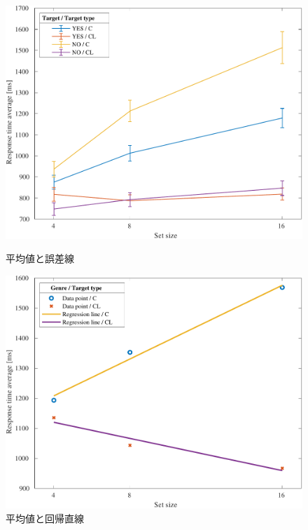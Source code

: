 \begin{figure}[H]
    \centering
    \begin{minipage}[b]{.49\textwidth}
        \centering
        \includegraphics[keepaspectratio,width=\textwidth]{../../Figures/14_01_graph.pdf}
        \caption{平均値と誤差線}
        \label{fig:平均値と誤差線}
    \end{minipage}
    \begin{minipage}[b]{.49\textwidth}
        \centering
        \includegraphics[keepaspectratio,width=\textwidth]{../../Figures/14_02_graph.pdf}
        \caption{平均値と回帰直線}
        \label{fig:平均値と回帰直線}
    \end{minipage}
\end{figure}
